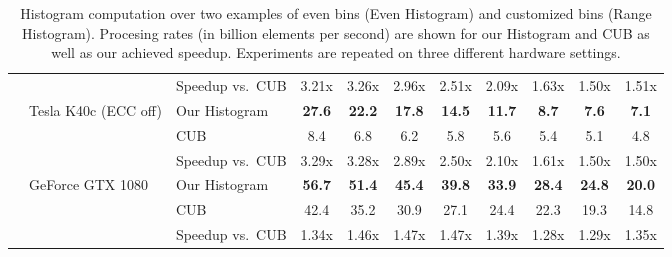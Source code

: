 \begin{table}
{\begin{tabular}{lll cccccccc}
  & & Speedup vs.\ CUB
                  & 3.21x &  3.26x &  2.96x &  2.51x &  2.09x &  1.63x &  1.50x &  1.51x \\
\cmidrule{2-11}
  & \multirow{3}{*}{Tesla K40c (ECC off)}
  & Our Histogram
    & \textbf{27.6}&  \textbf{22.2}&  \textbf{17.8}&  \textbf{14.5}&  \textbf{11.7}& \textbf{ 8.7}& \textbf{ 7.6}& \textbf{ 7.1}  \\
  & & CUB
        &  8.4&  6.8&  6.2&  5.8&  5.6&  5.4&  5.1&  4.8  \\
  & & Speedup vs.\ CUB
                & 3.29x &  3.28x &  2.89x &  2.50x &  2.10x &  1.61x &  1.50x &  1.50x\\
                  \cmidrule{2-11}
  & \multirow{3}{*}{GeForce GTX 1080}
  & Our Histogram
      &  \textbf{56.7}&  \textbf{51.4}&  \textbf{45.4}&  \textbf{39.8}&  \textbf{33.9}&  \textbf{28.4}&  \textbf{24.8}&  \textbf{20.0}\\
  & & CUB
        &  42.4 &  35.2 &  30.9 &  27.1 &  24.4 &  22.3 &  19.3 &  14.8 \\
  & & Speedup vs.\ CUB
                  & 1.34x &  1.46x &  1.47x &  1.47x &  1.39x &  1.28x &  1.29x &  1.35x \\
\bottomrule
\end{tabular}
}
\caption{Histogram computation over two examples of even bins (Even Histogram) and customized bins (Range Histogram). Procesing rates (in billion elements per second) are shown for our Histogram and CUB as well as our achieved speedup. Experiments are repeated on three different hardware settings.}\label{table:histogram_rate}
\end{table}
